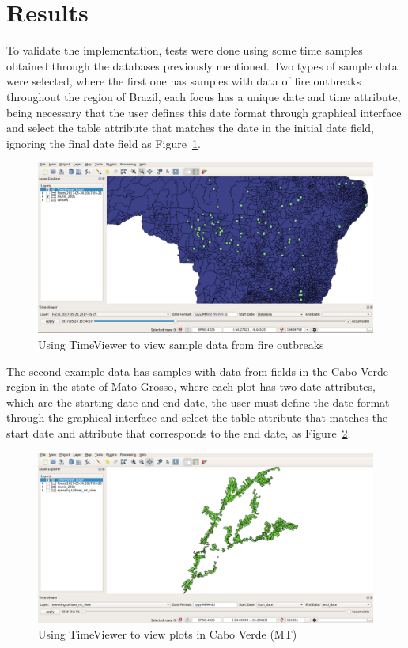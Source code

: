 \documentclass[12pt]{article}
\begin{document}
\section{Results}

To validate the implementation, tests were done using some time samples obtained through the databases previously mentioned. Two types of sample data were selected, where the first one has samples with data of fire outbreaks throughout the region of Brazil, each focus has a unique date and time attribute, being necessary that the user defines this date format through graphical interface and select the table attribute that matches the date in the initial date field, ignoring the final date field as Figure~\ref{fig:timeViewerData1}.

\begin{figure}[ht]
\centering
\includegraphics[width=.6\textwidth]{timeviewer-data1.png}
\caption{Using TimeViewer to view sample data from fire outbreaks}
\label{fig:timeViewerData1}
\end{figure}

The second example data has samples with data from fields in the Cabo Verde region in the state of Mato Grosso, where each plot has two date attributes, which are the starting date and end date, the user must define the date format through the graphical interface and select the table attribute that matches the start date and attribute that corresponds to the end date, as Figure~\ref{fig:timeViewerData2}.

\begin{figure}[ht]
\centering
\includegraphics[width=.6\textwidth]{timeviewer-data2.png}
\caption{Using TimeViewer to view plots in Cabo Verde (MT)}
\label{fig:timeViewerData2}
\end{figure}
\end{document}
